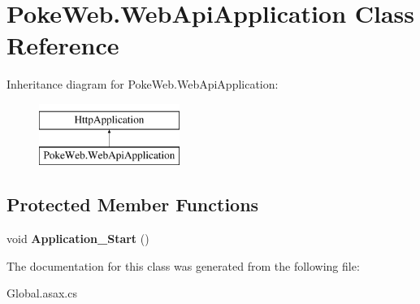\hypertarget{class_poke_web_1_1_web_api_application}{}\section{Poke\+Web.\+Web\+Api\+Application Class Reference}
\label{class_poke_web_1_1_web_api_application}
Inheritance diagram for Poke\+Web.\+Web\+Api\+Application\+:\begin{figure}[H]
\begin{center}
\leavevmode
\includegraphics[height=2.000000cm]{class_poke_web_1_1_web_api_application}
\end{center}
\end{figure}
\subsection*{Protected Member Functions}
\begin{DoxyCompactItemize}
\item 
\mbox{\label{class_poke_web_1_1_web_api_application_a63a50d86f7dd6e9417238218fe90cdb2}} 
void {\bfseries Application\+\_\+\+Start} ()
\end{DoxyCompactItemize}


The documentation for this class was generated from the following file\+:\begin{DoxyCompactItemize}
\item 
Global.\+asax.\+cs\end{DoxyCompactItemize}
